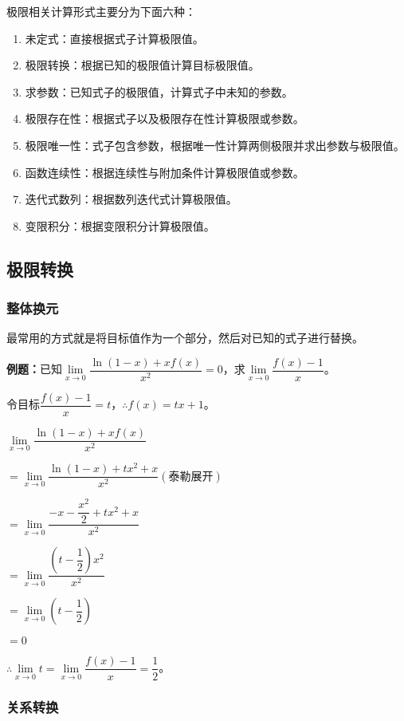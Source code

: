 \documentclass[UTF8, 12pt]{ctexart}
\begin{document}
极限相关计算形式主要分为下面六种：

\begin{enumerate}
    \item 未定式：直接根据式子计算极限值。
    \item 极限转换：根据已知的极限值计算目标极限值。
    \item 求参数：已知式子的极限值，计算式子中未知的参数。
    \item 极限存在性：根据式子以及极限存在性计算极限或参数。
    \item 极限唯一性：式子包含参数，根据唯一性计算两侧极限并求出参数与极限值。
    \item 函数连续性：根据连续性与附加条件计算极限值或参数。
    \item 迭代式数列：根据数列迭代式计算极限值。
    \item 变限积分：根据变限积分计算极限值。
\end{enumerate}

\subsection{极限转换}

\subsubsection{整体换元}

最常用的方式就是将目标值作为一个部分，然后对已知的式子进行替换。

\textbf{例题：}已知$\lim\limits_{x\to 0}\dfrac{\ln(1-x)+xf(x)}{x^2}=0$，求$\lim\limits_{x\to 0}\dfrac{f(x)-1}{x}$。\medskip

令目标$\dfrac{f(x)-1}{x}=t$，$\therefore f(x)=tx+1$。\medskip

$\lim\limits_{x\to 0}\dfrac{\ln(1-x)+xf(x)}{x^2}$\medskip

$=\lim\limits_{x\to 0}\dfrac{\ln(1-x)+tx^2+x}{x^2} (\text{泰勒展开})$\medskip

$=\lim\limits_{x\to 0}\dfrac{-x-\dfrac{x^2}{2}+tx^2+x}{x^2}$\medskip

$=\lim\limits_{x\to 0}\dfrac{\left(t-\dfrac{1}{2}\right)x^2}{x^2}$\medskip

$=\lim\limits_{x\to 0}\left(t-\dfrac{1}{2}\right)$

$=0$

$\therefore\lim\limits_{x\to 0}t=\lim\limits_{x\to 0}\dfrac{f(x)-1}{x}=\dfrac{1}{2}$。

\subsubsection{关系转换}
\end{document}

